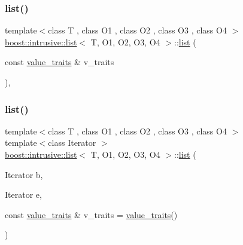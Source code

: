 \mbox{\label{classboost_1_1intrusive_1_1list_a1fdd256ce8cea0dda5b0a3166f6a30e2}} 
\subsubsection{\texorpdfstring{list()}{list()}\hspace{0.1cm}{\footnotesize\ttfamily [2/4]}}
{\footnotesize\ttfamily template$<$class T , class O1 , class O2 , class O3 , class O4 $>$ \\
\hyperlink{classboost_1_1intrusive_1_1list}{boost\+::intrusive\+::list}$<$ T, O1, O2, O3, O4 $>$\+::\hyperlink{classboost_1_1intrusive_1_1list}{list} (\begin{DoxyParamCaption}\item[{const \hyperlink{classboost_1_1intrusive_1_1list_aed9db2882c7567d4600fce5dda67c0ab}{value\+\_\+traits} \&}]{v\+\_\+traits }\end{DoxyParamCaption})\hspace{0.3cm}{\ttfamily [inline]}, {\ttfamily [explicit]}}

\mbox{\label{classboost_1_1intrusive_1_1list_a0465fd895d60bb9b4e7a4cc57aeae020}} 
\subsubsection{\texorpdfstring{list()}{list()}\hspace{0.1cm}{\footnotesize\ttfamily [3/4]}}
{\footnotesize\ttfamily template$<$class T , class O1 , class O2 , class O3 , class O4 $>$ \\
template$<$class Iterator $>$ \\
\hyperlink{classboost_1_1intrusive_1_1list}{boost\+::intrusive\+::list}$<$ T, O1, O2, O3, O4 $>$\+::\hyperlink{classboost_1_1intrusive_1_1list}{list} (\begin{DoxyParamCaption}\item[{Iterator}]{b,  }\item[{Iterator}]{e,  }\item[{const \hyperlink{classboost_1_1intrusive_1_1list_aed9db2882c7567d4600fce5dda67c0ab}{value\+\_\+traits} \&}]{v\+\_\+traits = {\ttfamily \hyperlink{classboost_1_1intrusive_1_1list_aed9db2882c7567d4600fce5dda67c0ab}{value\+\_\+traits}()} }\end{DoxyParamCaption})\hspace{0.3cm}{\ttfamily [inline]}}

